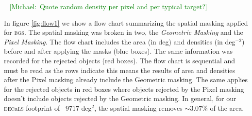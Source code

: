 \documentclass[fleqn,usenatbib]{mnras}
\newcommand{\mike}[1]{~\newline\noindent \textcolor{Green}{{ [Michael:~{#1}]\\}}}
\newcommand{\BGS}{\textsc{bgs}\xspace}
\newcommand{\DECaLS}{\textsc{dec}a\textsc{ls}\xspace}
\begin{document}
\mike{Quote random density per pixel and per typical target?}
 
In figure \ref{fig:flow1} we show a flow chart summarizing the spatial masking applied for \BGS. The spatial masking was broken in two, the {\it Geometric Masking} and the {\it Pixel Masking}. The flow chart includes the area (in deg) and densities (in deg$^{-2}$) before and after applying the masks (blue boxes). The same information was recorded for the rejected objects (red boxes). The flow chart is sequential and must be read as the rows indicate this means the results of area and densities after the Pixel masking already include the Geometric masking. The same applies for the rejected objects in red boxes where objects rejected by the Pixel masking doesn't include objects rejected by the Geometric masking. In general, for our \DECaLS footprint of ~$9717$ deg$^2$, the spatial masking removes $\sim 3.07 \% $ of the area.
\end{document}
